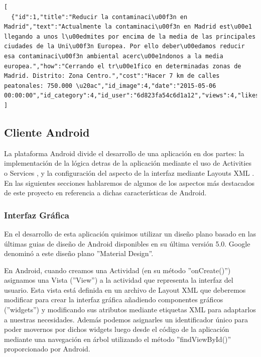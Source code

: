 \lstset{
  language        = c,    inputencoding=utf8}
\begin{lstlisting}[frame=single]
[
  {"id":1,"title":"Reducir la contaminaci\u00f3n en Madrid","text":"Actualmente la contaminaci\u00f3n en Madrid est\u00e1 llegando a unos l\u00edmites por encima de la media de las principales ciudades de la Uni\u00f3n Europea. Por ello deber\u00edamos reducir esa contaminaci\u00f3n ambiental acerc\u00e1ndonos a la media europea.","how":"Cerrando el tr\u00e1fico en determinadas zonas de Madrid. Distrito: Zona Centro.","cost":"Hacer 7 km de calles peatonales: 750.000 \u20ac","id_image":4,"date":"2015-05-06 00:00:00","id_category":4,"id_user":"6d823fa54c6d1a12","views":4,"likes":3,"not_understood":0,"dislikes":0}
]
\end{lstlisting}

\subsection{Cliente Android}

	La plataforma Android divide el desarrollo de una aplicación en dos partes: la implementación de la lógica detras de la aplicación mediante el uso de Activities \cite{ref:android_activities} o Services \cite{ref:android_service}, y la configuración del aspecto de la interfaz mediante Layouts XML \cite{ref:android_layout}. En las siguientes secciones hablaremos de algunos de los aspectos más destacados de este proyecto en referencia a dichas características de Android.

	\subsubsection{Interfaz Gráfica}
	
		En el desarrollo de esta aplicación quisimos utilizar un diseño plano basado en las últimas guias de diseño de Android disponibles en su última versión 5.0. Google denominó a este diseño plano ''Material Design''. 
	
		En Android, cuando creamos una Actividad (en su método ''onCreate()'') asignamos una Vista (''View'') a la actividad que representa la interfaz del usuario. Esta vista está definida en un archivo de Layout XML que deberemos modificar para crear la interfaz gráfica añadiendo componentes gráficos \cite{ref:android_widget} (''widgets'') y modificando sus atributos mediante etiquetas XML para adaptarlos a nuestras necesidades. Además podemos asignarles un identificador único para poder movernos por dichos widgets luego desde el código de la aplicación mediante una navegación en árbol utilizando el método ''findViewById()'' proporcionado por Android. 
		
